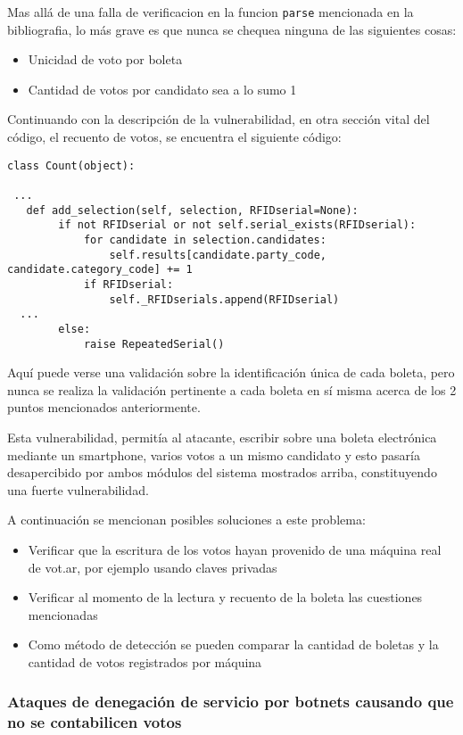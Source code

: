 Mas allá de una falla de verificacion en la funcion \texttt{parse} mencionada en la bibliografia, lo más grave es que nunca se chequea ninguna de las siguientes cosas:
\begin{itemize}
	\item Unicidad de voto por boleta
	\item Cantidad de votos por candidato sea a lo sumo 1
\end{itemize}

Continuando con la descripción de la vulnerabilidad, en otra sección vital del código, el recuento de votos, se encuentra el siguiente código:

\begin{lstlisting}
class Count(object):

 ...
   def add_selection(self, selection, RFIDserial=None):
        if not RFIDserial or not self.serial_exists(RFIDserial):
            for candidate in selection.candidates:
                self.results[candidate.party_code, candidate.category_code] += 1
            if RFIDserial:
                self._RFIDserials.append(RFIDserial)
  ...
        else:
            raise RepeatedSerial()
\end{lstlisting}

Aquí puede verse una validación sobre la identificación única de cada boleta, pero nunca se realiza la validación pertinente a cada boleta en sí misma acerca de los 2 puntos mencionados anteriormente.

Esta vulnerabilidad, permitía al atacante, escribir sobre una boleta electrónica mediante un smartphone, varios votos a un mismo candidato y esto pasaría desapercibido por ambos módulos del sistema mostrados arriba, constituyendo una fuerte vulnerabilidad.

A continuación se mencionan posibles soluciones a este problema:

\begin{itemize}
	\item Verificar que la escritura de los votos hayan provenido de una máquina real de vot.ar, por ejemplo usando claves privadas
	\item Verificar al momento de la lectura y recuento de la boleta las cuestiones mencionadas
	\item Como método de detección se pueden comparar la cantidad de boletas y la cantidad de votos registrados por máquina
\end{itemize}


\subsubsection{Ataques de denegación de servicio por botnets causando que no se contabilicen votos}

